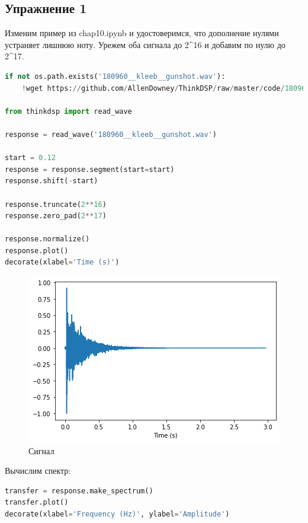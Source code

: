 \subsection{Упражнение 1}

Изменим пример из chap10.ipynb и удостоверимся, что дополнение нулями устраняет лишнюю ноту. Урежем оба сигнала до 2^16 и добавим по нулю до 2^17.

\begin{lstlisting}[language=Python]
if not os.path.exists('180960__kleeb__gunshot.wav'):
    !wget https://github.com/AllenDowney/ThinkDSP/raw/master/code/180960__kleeb__gunshot.wav
    
from thinkdsp import read_wave

response = read_wave('180960__kleeb__gunshot.wav')

start = 0.12
response = response.segment(start=start)
response.shift(-start)

response.truncate(2**16)
response.zero_pad(2**17)

response.normalize()
response.plot()
decorate(xlabel='Time (s)')
\end{lstlisting}

\begin{figure}[H]
	\begin{center}
		\includegraphics[scale=1]{fig/lab10/lab10_01.png}
		\caption{Сигнал}
	\end{center}
\end{figure}

Вычислим спектр:

\begin{lstlisting}[language=Python]
transfer = response.make_spectrum()
transfer.plot()
decorate(xlabel='Frequency (Hz)', ylabel='Amplitude')
\end{lstlisting}

